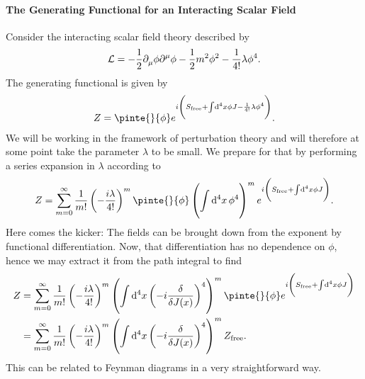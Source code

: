 \paragraph{The Generating Functional for an Interacting Scalar Field}
Consider the interacting scalar field theory described by
\begin{align*}
	\mathcal{L} = -\frac{1}{2}\partial^{}_{\mu}\phi\partial^{\mu}_{}\phi - \frac{1}{2}m^{2}\phi^{2} - \frac{1}{4!}\lambda\phi^{4}.
\end{align*}
The generating functional is given by
\begin{align*}
	Z = \pinte{}{\phi}e^{i\left(S_{\text{free}} + \integ[4]{}{}{x}{\phi J - \frac{1}{4!}\lambda\phi^{4}}\right)}.
\end{align*}
We will be working in the framework of perturbation theory and will therefore at some point take the parameter $\lambda$ to be small. We prepare for that by performing a series expansion in $\lambda$ according to
\begin{align*}
	Z = \sum\limits_{m = 0}^{\infty}\frac{1}{m!}\left(-\frac{i\lambda}{4!}\right)^{m}\pinte{}{\phi}\left(\integ[4]{}{}{x}{\phi^{4}}\right)^{m}e^{i\left(S_{\text{free}} + \integ[4]{}{}{x}{\phi J}\right)}.
\end{align*}
Here comes the kicker: The fields can be brought down from the exponent by functional differentiation. Now, that differentiation has no dependence on $\phi$, hence we may extract it from the path integral to find
\begin{align*}
	Z &= \sum\limits_{m = 0}^{\infty}\frac{1}{m!}\left(-\frac{i\lambda}{4!}\right)^{m}\left(\integ[4]{}{}{x}{\left(-i\fdv{J(x)}\right)^{4}}\right)^{m}\pinte{}{\phi}e^{i\left(S_{\text{free}} + \integ[4]{}{}{x}{\phi J}\right)} \\
	  &= \sum\limits_{m = 0}^{\infty}\frac{1}{m!}\left(-\frac{i\lambda}{4!}\right)^{m}\left(\integ[4]{}{}{x}{\left(-i\fdv{J(x)}\right)^{4}}\right)^{m}Z_{\text{free}}.
\end{align*}
This can be related to Feynman diagrams in a very straightforward way.

